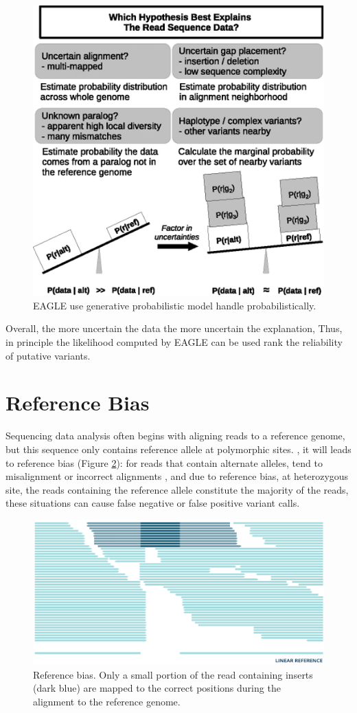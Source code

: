 \begin{figure}[H]
    \centering
    \includegraphics[width=0.6\columnwidth]{body/image/2-1.png}
    \captionsetup{labelfont=bf}
    \renewcommand{\baselinestretch}{1.0}
    \caption[EAGLE model]{EAGLE use generative probabilistic model handle probabilistically.}
    \label{f2-1}
\end{figure}
 

Overall, the more uncertain the data the more uncertain the explanation, Thus, in principle the likelihood computed by EAGLE can be used rank the reliability of putative variants.
\section{Reference Bias}
Sequencing data analysis often begins with aligning reads to a reference genome, but this sequence only contains reference allele at polymorphic sites. \cite{martiniano2020removing}, it will leads to reference bias (Figure \ref{f2-2}): for reads that contain alternate alleles, tend to misalignment or incorrect alignments \cite{chen2021reference}, and due to reference bias, at heterozygous site, the reads containing the reference allele constitute the majority of the reads, these situations can cause false negative or false positive variant calls. \cite{gunther2019presence}

\begin{figure}[H]
    \centering
    \includegraphics[width=1\columnwidth]{body/image/2-2.png}
    \captionsetup{labelfont=bf}
    \renewcommand{\baselinestretch}{1.0}
    \vspace{-1cm}
    \caption[Reference bias]{Reference bias. Only a small portion of the read containing inserts (dark blue) are mapped to the correct positions during the alignment to the reference genome.}
    \label{f2-2}
\end{figure}
 

